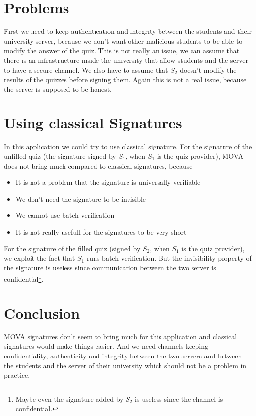 \documentclass[12pt,a4paper]{article}
\begin{document}
    \section{Problems}
    First we need to keep authentication and integrity between the students and their university server, because we don't want other malicious students to be able to modify the answer 
    of the quiz. This is not really an issue, we can assume that there is an infrastructure inside the university that allow students and the server to have a secure channel.
    We also have to assume that $S_2$ doesn't modify the results of the quizzes before signing them. Again this is not a real issue, because the server is supposed to be honest.

    \section{Using classical Signatures}
    In this application we could try to use classical signature. For the signature of the unfilled quiz (the signature signed by $S_1$, when $S_1$ is the quiz provider), 
    MOVA does not bring much compared to classical signatures, because
    \begin{itemize}
        \item It is not a problem that the signature is universally verifiable
        \item We don't need the signature to be invisible
        \item We cannot use batch verification
        \item It is not really usefull for the signatures to be very short
    \end{itemize}
    For the signature of the filled quiz (signed by $S_2$, when $S_1$ is the quiz provider), we exploit the fact that $S_1$
    runs batch verification. But the invisibility property of the signature is useless since communication between the two 
    server is confidential\footnote{Maybe even the signature added by $S_2$ is 
    useless since the channel is confidential.}.

    \section{Conclusion}
    MOVA signatures don't seem to bring much for this application and classical signatures would make things easier. And we need channels keeping confidentiality, authenticity and integrity
    between the two servers and between the students and the server of their university which should not be a problem in practice.
\end{document}
